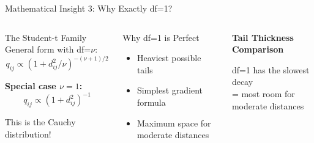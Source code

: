 \documentclass[aspectratio=169]{beamer}
\begin{document}
\begin{frame}{Mathematical Insight 3: Why Exactly df=1?}
\begin{columns}
\begin{block}{The Student-t Family}
General form with df=$\nu$:
$$q_{ij} \propto (1 + d_{ij}^2/\nu)^{-(\nu+1)/2}$$

\textbf{Special case $\nu=1$:}
$$q_{ij} \propto (1 + d_{ij}^2)^{-1}$$

This is the Cauchy distribution!
\end{block}

\vspace{1mm}
\begin{block}{Why df=1 is Perfect}
\begin{itemize}
\item Heaviest possible tails
\item Simplest gradient formula
\item Maximum space for moderate distances
\end{itemize}
\end{block}

\begin{center}
\textbf{Tail Thickness Comparison}\\[3mm]

\vspace{3mm}
df=1 has the slowest decay\\
= most room for moderate distances
\end{center}
\end{columns}
\end{frame}
\end{document}
